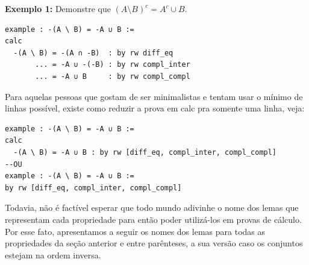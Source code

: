 \textbf{Exemplo 1:} Demonstre que $(A \setminus B)^c = A^c \cup B$.
\begin{lstlisting}
example : -(A \ B) = -A ∪ B :=
calc
  -(A \ B) = -(A ∩ -B)  : by rw diff_eq
       ... = -A ∪ -(-B) : by rw compl_inter
       ... = -A ∪ B     : by rw compl_compl \end{lstlisting}

Para aquelas pessoas que gostam de ser minimalistas e tentam usar o mínimo de linhas possível, existe como reduzir a prova em {\selectfont calc} pra somente uma linha, veja:

\begin{lstlisting}
example : -(A \ B) = -A ∪ B :=
calc
  -(A \ B) = -A ∪ B : by rw [diff_eq, compl_inter, compl_compl]
--OU
example : -(A \ B) = -A ∪ B :=
by rw [diff_eq, compl_inter, compl_compl] \end{lstlisting}

Todavia, não é factível esperar que todo mundo adivinhe o nome dos lemas que representam cada propriedade para então poder utilizá-los em provas de cálculo. Por esse fato, apresentamos a seguir os nomes dos lemas para todas as propriedades da seção anterior e entre parênteses, a sua versão caso os conjuntos estejam na ordem inversa.


